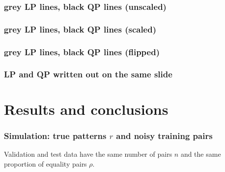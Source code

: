 \documentclass{beamer}
\begin{document}
\begin{frame}
  \frametitle{grey LP lines, black QP lines (unscaled)}
  
\end{frame}

\begin{frame}
  \frametitle{grey LP lines, black QP lines (scaled)}
  
\end{frame}

\begin{frame}
  \frametitle{grey LP lines, black QP lines (flipped)}
  
\end{frame}

\begin{frame}
  \frametitle{LP and QP written out on the same slide}
  
\end{frame}

%       

\section{Results and conclusions}

\begin{frame}
  \frametitle{Simulation: true patterns $r$ and noisy training pairs}
  \begin{minipage}{1.0\linewidth}
    \hskip -0.5cm  Validation and test data
    have the same number of pairs $n$ and the same proportion of
    equality pairs $\rho$.
  \end{minipage}
\end{frame}
\end{document}

